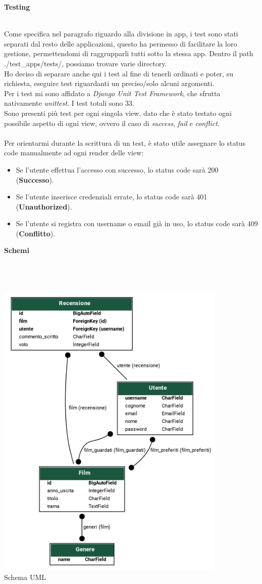 \documentclass[12pt]{article}
\begin{document}
	
	\noindent \centerline {\Huge \textbf{Testing}} \\
	
	\noindent Come specifica nel paragrafo riguardo alla divisione in app, i test sono stati separati dal resto delle applicazioni, questo ha permesso di facilitare la loro gestione, permettendomi di raggrupparli tutti sotto la stessa app. Dentro il path ./test\_apps/tests/, possiamo trovare varie directory. \\Ho deciso di separare anche qui i test al fine di tenerli ordinati e poter, su richiesta, eseguire test riguardanti un preciso/solo alcuni argomenti. \\
	Per i test mi sono affidato a \textit{Django Unit Test Framework}, che sfrutta nativamente \textit{unittest}.
	I test totali sono 33. \\
	Sono presenti più test per ogni singola view, dato che è stato testato ogni possibile aspetto di ogni view, ovvero il caso di \textit{success}, \textit{fail} e \textit{conflict}. \\ \\
	Per orientarmi durante la scrittura di un test, è stato utile assegnare lo status code manualmente ad ogni render delle view:
	\begin{itemize}
		\item Se l'utente effettua l'accesso con successo, lo status code sarà 200 (\textbf{Successo}).
		\item Se l'utente inserisce credenziali errate, lo status code sarà 401 (\textbf{Unauthorized}).
		\item Se l'utente si registra con username o email già in uso, lo status code sarà 409 (\textbf{Conflitto}).
	\end{itemize}
	\pagebreak
	
	
	\noindent \centerline {\Huge \textbf{Schemi}} \\ \\ \\
	\centering \includegraphics[width=11cm, ]{Immagini/uml_schema_streamify.png} \\
	\centering Schema UML
	
	
	
	
\end{document}
